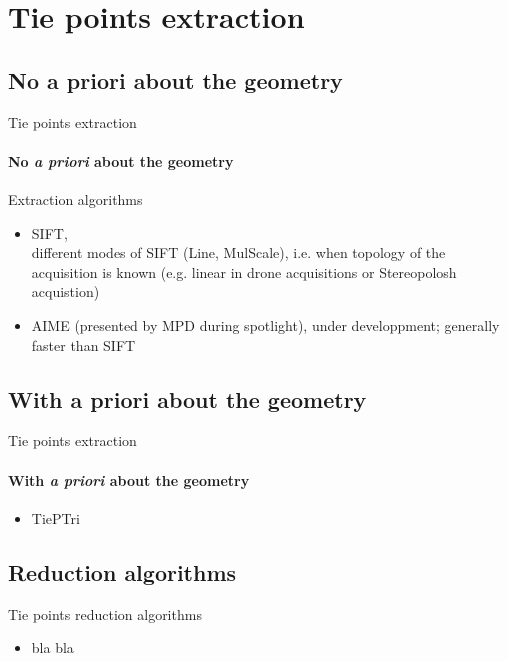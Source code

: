 \documentclass{beamer}
\begin{document}
		\section{Tie points extraction}
			\subsection{No {a priori} about the geometry }        
				\begin{frame}{Tie points extraction }
					\framesubtitle{No \textit{a priori} about the geometry}
			
				\begin{block}{Extraction algorithms}
			
				
					\begin{itemize}
					\item SIFT, \\different modes of SIFT (Line, MulScale), i.e. when topology of the acquisition is known (e.g. linear in drone acquisitions or Stereopolosh acquistion)
					\item AIME (presented by MPD during spotlight), under developpment; generally faster than SIFT
					\end{itemize}
 				\end{block}	
					

			
				\end{frame}

			\subsection{With {a priori} about the geometry }        
				\begin{frame}{Tie points extraction }
					\framesubtitle{With \textit{a priori} about the geometry}
					\begin{itemize}
					\item TiePTri
					\end{itemize}
				\end{frame}
        
        	\subsection{Reduction algorithms}
        		\begin{frame}{Tie points reduction algorithms}
        			\begin{itemize}
					\item bla bla
					\end{itemize}
        		\end{frame} 
					
\end{document}
